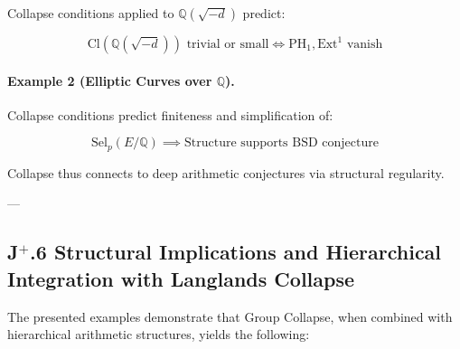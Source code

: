 \documentclass[11pt]{article}
\begin{document}
Collapse conditions applied to $\mathbb{Q}(\sqrt{-d})$ predict:

\[
\mathrm{Cl}(\mathbb{Q}(\sqrt{-d})) \text{ trivial or small} \iff \mathrm{PH}_1, \mathrm{Ext}^1 \text{ vanish}
\]

\paragraph{Example 2 (Elliptic Curves over $\mathbb{Q}$).}

Collapse conditions predict finiteness and simplification of:

\[
\mathrm{Sel}_p(E/\mathbb{Q}) \implies \text{Structure supports BSD conjecture}
\]

Collapse thus connects to deep arithmetic conjectures via structural regularity.

---

\subsection*{J$^{+}$.6 Structural Implications and Hierarchical Integration with Langlands Collapse}

The presented examples demonstrate that Group Collapse, when combined with hierarchical arithmetic structures, yields the following:
\end{document}
